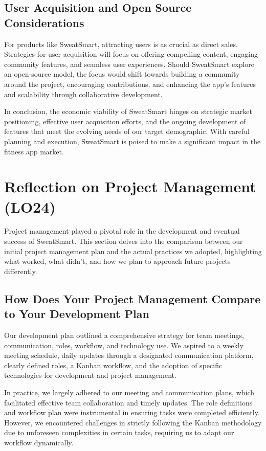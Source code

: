 \documentclass{article}
\begin{document}
\subsection{User Acquisition and Open Source Considerations}

For products like SweatSmart, attracting users is as crucial as direct sales. Strategies for user acquisition will focus on offering compelling content, engaging community features, and seamless user experiences. Should SweatSmart explore an open-source model, the focus would shift towards building a community around the project, encouraging contributions, and enhancing the app’s features and scalability through collaborative development.

In conclusion, the economic viability of SweatSmart hinges on strategic market positioning, effective user acquisition efforts, and the ongoing development of features that meet the evolving needs of our target demographic. With careful planning and execution, SweatSmart is poised to make a significant impact in the fitness app market.

\section{Reflection on Project Management (LO24)}

Project management played a pivotal role in the development and eventual success of SweatSmart. This section delves into the comparison between our initial project management plan and the actual practices we adopted, highlighting what worked, what didn't, and how we plan to approach future projects differently.

\subsection{How Does Your Project Management Compare to Your Development Plan}

Our development plan outlined a comprehensive strategy for team meetings, communication, roles, workflow, and technology use. We aspired to a weekly meeting schedule, daily updates through a designated communication platform, clearly defined roles, a Kanban workflow, and the adoption of specific technologies for development and project management.

In practice, we largely adhered to our meeting and communication plans, which facilitated effective team collaboration and timely updates. The role definitions and workflow plan were instrumental in ensuring tasks were completed efficiently. However, we encountered challenges in strictly following the Kanban methodology due to unforeseen complexities in certain tasks, requiring us to adapt our workflow dynamically.
\end{document}
